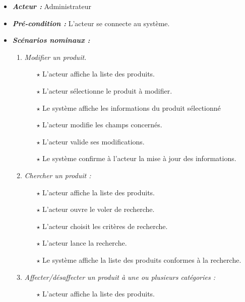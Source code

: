 \begin{itemize}
\begin{itemize}
    \item \textit{\textbf{Acteur :}} Administrateur

    \item \textit{\textbf{Pré-condition  :}} L’acteur se connecte au système. 

    \item \textit{\textbf{Scénarios nominaux :}}
         \begin{enumerate}
             \item \textit{Modifier un produit.}
                    \begin{itemize}
                       \item[$\star$] L’acteur affiche la liste des produits. 
                       \item[$\star$] L’acteur sélectionne le produit à modifier. 
                       \item[$\star$] Le système affiche les informations du produit sélectionné
                       \item[$\star$] L’acteur modifie les champs concernés. 
                       \item[$\star$] L’acteur valide ses modifications. 
                       \item[$\star$] Le système confirme à l’acteur la mise à jour des informations.
                    \end{itemize}
                \item \textit{Chercher un produit :}
                    \begin{itemize}
                       \item[$\star$] L’acteur affiche la liste des produits. 
                       \item[$\star$] L’acteur ouvre le voler de recherche. 
                       \item[$\star$] L'acteur choisit les critères de recherche. 
                       \item[$\star$] L’acteur lance la recherche.
                       \item[$\star$] Le système affiche la liste des produits conformes à la recherche.
                    \end{itemize}
                \item \textit{Affecter/désaffecter un produit à une ou plusieurs catégories :}
                    \begin{itemize}
                        \item[$\star$] L’acteur affiche la liste des produits. 

\end{itemize}
\end{enumerate}
\end{itemize}
\end{itemize}
